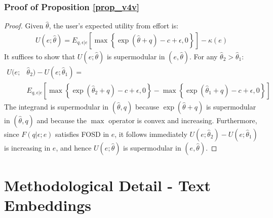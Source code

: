 \subsubsection*{Proof of Proposition \ref{prop_v4v}}

\begin{proof}
Given $\hat{\theta}$, the user's expected utility from effort is:
\begin{align*}
U(e;\hat{\theta}) = E_{q,\epsilon|e} \left[ \max \left\{ \exp (\hat{\theta} + q) - c + \epsilon, 0 \right\} \right] - \kappa(e)
\end{align*}
It suffices to show that $U(e; \hat{\theta})$ is supermodular in $(e, \hat{\theta})$. For any $\hat{\theta}_2 > \hat{\theta}_1$:
\begin{align*}
U(e;&\hat{\theta}_2) - U(e;\hat{\theta}_1) = \\
& E_{q,\epsilon|e}\left[ \max \left\{ \exp( \hat{\theta}_2 + q) - c + \epsilon, 0\right\} - \max \left\{ \exp( \hat{\theta}_1 + q) - c + \epsilon, 0 \right\} \right]
\end{align*}
The integrand is supermodular in $(\hat{\theta},q)$ because  $\exp(\hat{\theta} + q)$ is supermodular in $(\hat{\theta}, q)$ and because the $\max$ operator is convex and increasing. Furthermore, since $F(q|\epsilon;e)$ satisfies FOSD in $e$, it follows immediately $U(e;\hat{\theta}_2)-U(e;\hat{\theta}_1)$ is increasing in $e$, and hence $U(e;\hat{\theta})$ is supermodular in $(e,\hat{\theta}).$
\end{proof}

\section{Methodological Detail - Text Embeddings}

